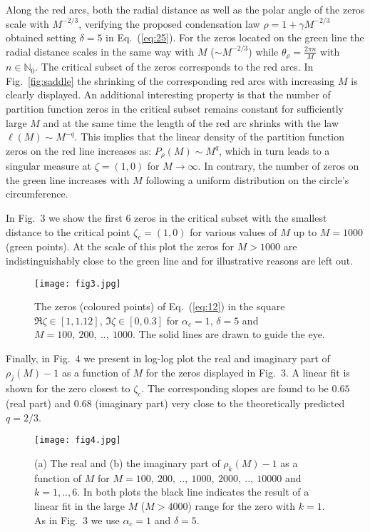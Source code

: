 \documentclass[aps,pre,showpacs,amsmath,amssymb,superscriptaddress,twocolumn]{revtex4-1}
\begin{document}
Along the red arcs, both the radial distance as well as the polar angle of the zeros scale with 
$M^{-2/3}$, verifying the proposed condensation law $\rho = 1 + \gamma M^{-2/3}$ obtained setting $\delta=5$ in Eq.~(\ref{eq:25}). For the zeros located on the green line the radial distance scales in the same way with $M$ ($\sim M^{-2/3}$) while $\theta_{\rho}=\frac{2 \pi n}{M}$ with $n \in \mathbb{N}_0$. The critical subset of the zeros corresponds to the red arcs. In Fig.~\ref{fig:saddle} the shrinking of the corresponding red arcs with increasing $M$ is clearly displayed. An additional interesting property is that the number of partition function zeros in the critical subset remains constant for sufficiently large $M$ and at the same time the length of the red arc shrinks with the law $\ell(M) \sim M^{-q}$. This implies that the linear density of the partition function zeros on the red line increases as: $P_{\rho}(M) \sim M^q$, which in turn leads to a singular measure at $\zeta=(1,0)$ for $M \to \infty$. In contrary, the number of zeros on the green line increases with $M$ following a uniform distribution on the circle's circumference.
 

In Fig.~3 we show the first $6$ zeros in the critical subset with the smallest distance to the critical point $\zeta_c=(1,0)$ for various values of $M$ up to $M=1000$ (green points). At the scale of this plot the zeros for $M > 1000$ are indistinguishably close to the green line and for illustrative reasons are left out.
\begin{figure}[tbp]
\centering
\texttt{[image: fig3.jpg]}
\caption{The zeros (coloured points) of Eq.~(\ref{eq:12}) in the square $\Re \zeta \in [1,1.12]$, $\Im \zeta \in [0,0.3]$ for $\alpha_c=1$, $\delta=5$ and $M=100,~200,~..,~1000$. The solid lines are drawn to guide the eye.}
\label{fig:zeta_plane}
\end{figure}
Finally, in Fig.~4 we present in log-log plot the real and imaginary part of $\rho_j(M)-1$ as a function of $M$ for the zeros displayed in Fig.~3. A linear fit is shown for the zero closest to $\zeta_c$. The corresponding slopes are found to be $0.65$ (real part) and $0.68$ (imaginary part) very close to the theoretically predicted $q=2/3$.  

\begin{figure}[tbp]
\centering
\texttt{[image: fig4.jpg]}
\caption{(a) The real and (b) the imaginary part of $\rho_k(M) - 1$ as a function of $M$ for $M=100,~200,~..,~1000,~2000,~..,~10000$ and $k=1,..,6$. In both plots the black line indicates the result of a linear fit in the large $M$ ($M >4000$) range for the zero with $k=1$. As in Fig.~3 we use $\alpha_c=1$ and $\delta=5$.}
\label{fig:rootsk}
\end{figure}   
\end{document}
